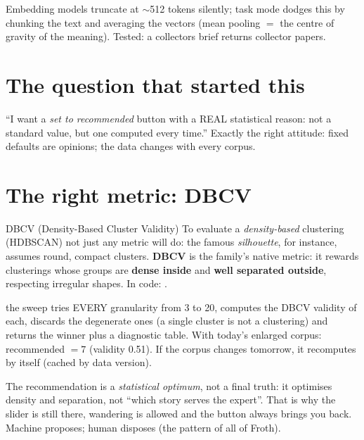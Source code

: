 \documentclass[11pt,a4paper]{article}
\begin{document}
\begin{resumen}
Embedding models truncate at $\sim$512 tokens silently; task mode dodges this by chunking the
text and averaging the vectors (mean pooling $=$ the centre of gravity of the meaning). Tested:
a collectors brief returns collector papers.
\end{resumen}
\clearpage
{}
{}

\section{The question that started this}

``I want a \emph{set to recommended} button with a REAL statistical reason: not a standard
value, but one computed every time.'' Exactly the right attitude: fixed defaults are opinions;
the data changes with every corpus.

\section{The right metric: DBCV}

\begin{concepto}{DBCV (Density-Based Cluster Validity)}
To evaluate a \emph{density-based} clustering (HDBSCAN) not just any metric will do: the famous
\emph{silhouette}, for instance, assumes round, compact clusters. \textbf{DBCV} is the family's
native metric: it rewards clusterings whose groups are \textbf{dense inside} and
\textbf{well separated outside}, respecting irregular shapes.
In code: .
\end{concepto}

\begin{concepto}{the sweep}
 tries EVERY granularity from 3 to 20, computes
the DBCV validity of each, discards the degenerate ones (a single cluster is not a clustering)
and returns the winner plus a diagnostic table. With today's enlarged corpus: recommended
$= 7$ (validity 0.51). If the corpus changes tomorrow, it recomputes by itself (cached by data
version).
\end{concepto}

\begin{ojo}
The recommendation is a \emph{statistical optimum}, not a final truth: it optimises density and
separation, not ``which story serves the expert''. That is why the slider is still there,
wandering is allowed and the button always brings you back. Machine proposes; human disposes
(the pattern of all of Froth).
\end{ojo}
\end{document}
